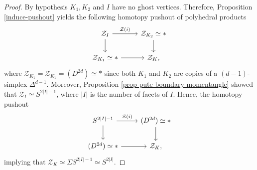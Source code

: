 \documentclass[10pt,a4paper]{amsart}
\newcommand{\ZZ}{\mathcal{Z}}
\begin{document}
\begin{proof}
	By hypothesis $K_1,K_2$ and $I$ have no ghost vertices. Therefore, Proposition \ref{induce-pushout} yields the following homotopy pushout of polyhedral products
	\[
	\begin{tikzcd}
		\ZZ_{I}\arrow[r, "\ZZ(i)"] \arrow[d] & \ZZ_{K_2} \simeq * \arrow[d] \\
		\ZZ_{K_1} \simeq * \arrow[r]  & \ZZ_{K},
	\end{tikzcd}
	\]
	where $\ZZ_{K_1} = \ZZ_{K_1} = (D^{2d}) \simeq *$ since both $K_1$ and $K_2$ are copies of a $(d-1)$-simplex $\Delta^{d-1}$. Moreover, Proposition \ref{prop-pute-boundary-momentangle} showed that $\ZZ_{I} \simeq S^{2|I|-1}$, where $|I|$ is the number of facets of $I$.
 	Hence, the homotopy pushout
	\[
	\begin{tikzcd}
		S^{2|I| -1}\arrow[r, "\ZZ(i)"] \arrow[d] &  (D^{2d}) \simeq * \arrow[d] \\
		(D^{2d}) \simeq *  \arrow[r]  & \ZZ_{K},
	\end{tikzcd}
	\]
     implying that $\ZZ_{K} \simeq \Sigma S^{2|I| -1} \simeq S^{2|I|}$.	
\end{proof}
\end{document}
